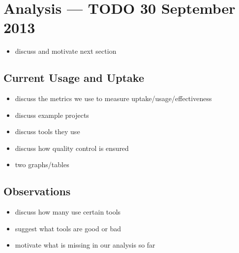 \chapter{Analysis --- TODO 30 September 2013}

\begin{itemize}
  \item discuss and motivate next section
\end{itemize}

\section{Current Usage and Uptake}

\begin{itemize}
  \item discuss the metrics we use to measure uptake/usage/effectiveness
  \item discuss example projects
  \item discuss tools they use
  \item discuss how quality control is ensured
  \item two graphs/tables
\end{itemize}

\section{Observations}

\begin{itemize}
  \item discuss how many use certain tools
  \item suggest what tools are good or bad
  \item motivate what is missing in our analysis so far
\end{itemize}
